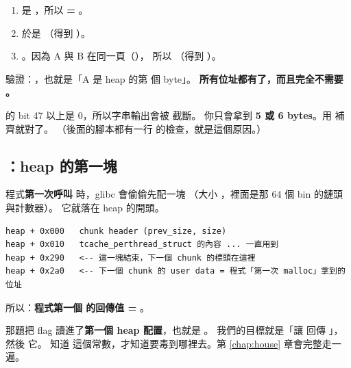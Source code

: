 \begin{keybox}[怎麼從這兩個數字算出所有位址]
\begin{enumerate}[leftmargin=1.4em,itemsep=1pt]
  \item {} 是 ，所以 \textbf{ = }。
  \item 於是 （得到 ）。
  \item {}。因為 A 與 B 在同一頁（），
        所以 （得到 ）。
\end{enumerate}

驗證：，也就是「A 是 heap 的第  個 byte」。
\textbf{所有位址都有了，而且完全不需要 。}
\end{keybox}

\begin{warnbox}
 的 bit 47 以上是 0，所以字串輸出會被  截斷。
你只會拿到 \textbf{5 或 6 bytes}。用  補齊就對了。
（後面的腳本都有一行  的檢查，就是這個原因。）
\end{warnbox}

\subsection{：heap 的第一塊}

\begin{keybox}
程式\textbf{第一次呼叫 } 時，glibc 會偷偷先配一塊
（大小 ，裡面是那 64 個 bin 的鏈頭與計數器）。
它就落在 heap 的開頭。

\begin{lstlisting}[style=raw]
heap + 0x000   chunk header (prev_size, size)
heap + 0x010   tcache_perthread_struct 的內容 ... 一直用到
heap + 0x290   <-- 這一塊結束，下一個 chunk 的標頭在這裡
heap + 0x2a0   <-- 下一個 chunk 的 user data = 程式「第一次 malloc」拿到的位址
\end{lstlisting}

所以：\textbf{程式第一個  的回傳值 = }。
\end{keybox}

\begin{whybox}
那題把 flag 讀進了\textbf{第一個 heap 配置}，也就是 。
我們的目標就是「讓  回傳 」，然後  它。
知道  這個常數，才知道要毒到哪裡去。第 \ref{chap:house} 章會完整走一遍。
\end{whybox}

